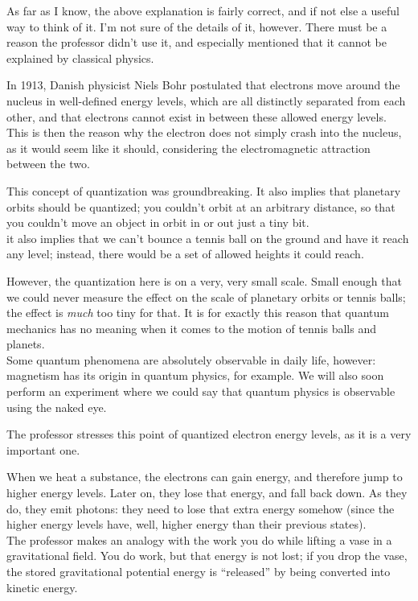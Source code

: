 \documentclass[8.01x]{subfiles}
\begin{document}
As far as I know, the above explanation is fairly correct, and if not else a useful way to think of it. I'm not sure of the details of it, however. There must be a reason the professor didn't use it, and especially mentioned that it cannot be explained by classical physics.

In 1913, Danish physicist Niels Bohr postulated that electrons move around the nucleus in well-defined energy levels, which are all distinctly separated from each other, and that electrons cannot exist in between these allowed energy levels. This is then the reason why the electron does not simply crash into the nucleus, as it would seem like it should, considering the electromagnetic attraction between the two.

This concept of quantization was groundbreaking. It also implies that planetary orbits should be quantized; you couldn't orbit at an arbitrary distance, so that you couldn't move an object in orbit in or out just a tiny bit.\\
it also implies that we can't bounce a tennis ball on the ground and have it reach any level; instead, there would be a set of allowed heights it could reach.

However, the quantization here is on a very, very small scale. Small enough that we could never measure the effect on the scale of planetary orbits or tennis balls; the effect is \emph{much} too tiny for that. It is for exactly this reason that quantum mechanics has no meaning when it comes to the motion of tennis balls and planets.\\
Some quantum phenomena are absolutely observable in daily life, however: magnetism has its origin in quantum physics, for example. We will also soon perform an experiment where we could say that quantum physics is observable using the naked eye.

The professor stresses this point of quantized electron energy levels, as it is a very important one.

When we heat a substance, the electrons can gain energy, and therefore jump to higher energy levels. Later on, they lose that energy, and fall back down. As they do, they emit photons: they need to lose that extra energy somehow (since the higher energy levels have, well, higher energy than their previous states).\\
The professor makes an analogy with the work you do while lifting a vase in a gravitational field. You do work, but that energy is not lost; if you drop the vase, the stored gravitational potential energy is ``released'' by being converted into kinetic energy.
\end{document}
